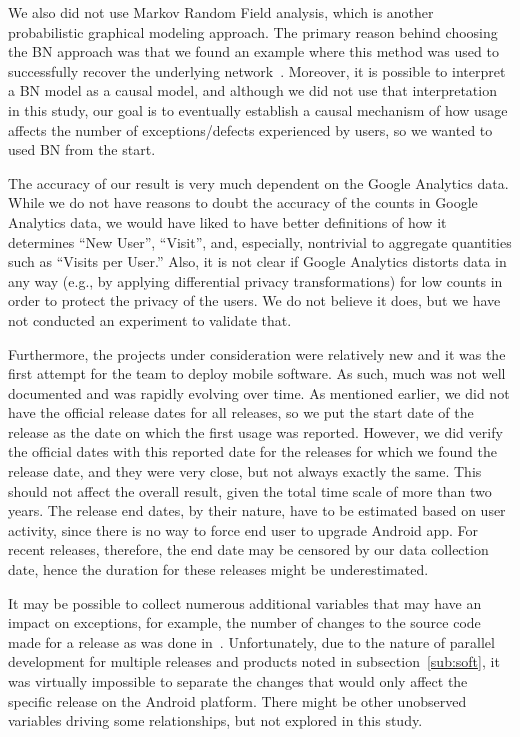 \documentclass[smallextended]{svjour3}       %
\begin{document}
We also did not use Markov Random Field analysis, which is another probabilistic graphical modeling approach. The primary reason behind choosing the BN approach was that we found an example where this method was used to successfully recover the underlying network~\cite{bnppt}. 
Moreover, it is possible to interpret a BN model as a causal model, and although we did not use that interpretation in this study, our goal is to eventually establish a causal mechanism of how usage affects the number of exceptions/defects experienced by users, so we wanted to used BN from the start.


The accuracy of our result is very much dependent on the Google
Analytics data. While we do not have reasons to doubt the accuracy of
the counts in Google
Analytics data, we would have liked to have better definitions of
how it determines ``New User'', ``Visit'', and, especially,
nontrivial to aggregate quantities such as ``Visits per User.'' Also,
it is not clear if Google
Analytics distorts data in any way (e.g., by applying differential 
privacy transformations) for low counts in order to protect
the privacy of the users. We do not believe it does, but we have not
conducted an experiment to validate that. 

Furthermore, the projects under consideration were relatively new and
it was the first attempt for the team to deploy mobile software. As
such, much was not well documented and was rapidly
evolving over time. As mentioned earlier, we did not have the official release
dates for all releases, so we put the start date of the release as
the date on which the first usage was reported. However, we did
verify the official dates with this reported date for the releases
for which we found the release date, and they were very close, but
not always exactly the same. This should not affect
the overall result, given the total time scale of more than two
years. The release end dates, by their nature, have to be estimated 
based on user activity, since there is no way to force end user
to upgrade Android app. For recent releases, therefore, the end date 
may be censored by our data
collection date, hence the duration for these releases might be
underestimated. 

It may be possible to collect numerous additional variables that may
have an impact on exceptions, for example, the number of changes to
the source code made for a release as was done
in~\cite{IQ08}. Unfortunately, due to the nature of parallel
development for multiple releases and products noted in
subsection~\ref{sub:soft}, it was virtually impossible to separate
the changes that would only affect the specific release on the Android
platform. There might be other unobserved variables driving some
relationships, but not explored in this study. 
\end{document}
